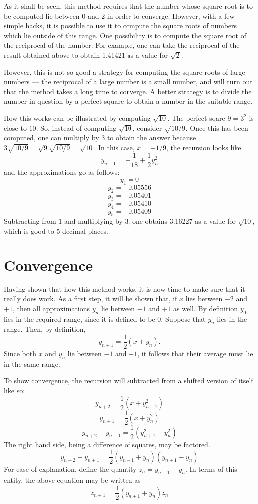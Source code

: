 \documentclass[12pt]{article}
\begin{document}
As it shall be seen, this method requires that the number whose square root is to be computed lie between 0 and 2 in order to converge.  However, with a few simple hacks, it is possible to use it to compute the square roots of numbers which lie outside of this range.  One possibility is to compute the square root of the reciprocal of the number.  For example, one can take the reciprocal of the result obtained above to obtain 1.41421 as a value for $\sqrt{2}$.

However, this is not so good a strategy for computing the square roots of large numbers --- the reciprocal of a large number is a small number, and will turn out that the method takes a long time to converge.  A better strategy is to divide the number in question by a perfect square to obtain a number in the suitable range.  

How this works can be illustrated by computing $\sqrt{10}$.  The perfect sqare $9 = 3^2$ is close to $10$.  So, instead of computing $\sqrt{10}$, consider $\sqrt{10/9}$.  Once this has been computed, one can multiply by $3$ to obtain the answer because $3 \sqrt{10/9} = \sqrt{9} \sqrt{10/9} = \sqrt{10}$.  In this case, $x = -1/9$, the recursion looks like
 \[ y_{n+1} = -\frac{1}{18} + \frac{1}{2} y_n^2 \]
and the approximations go as follows:
 \[ y_1 = 0 \]
 \[ y_2 = -0.05556 \]
 \[ y_3 = -0.05401 \]
 \[ y_4 = -0.05410 \]
 \[ y_5 = -0.05409 \]
Subtracting from 1 and multiplying by 3, one obtains 3.16227 as a value for $\sqrt{10}$, which is good to 5 decimal places.

\section{Convergence}

Having shown that how this method works, it is now time to make sure that it really does work.  As a first step, it will be shown that, if $x$ lies between $-2$ and $+1$, then all approximations $y_n$ lie between $-1$ and $+1$ as well.  By definition $y_0$ lies in the required range, since it is defined to be 0.  Suppose that $y_n$ lies in the range.  Then, by definition,
 \[ y_{n+1} = \frac{1}{2} (x + y_n) .\]
Since both $x$ and $y_n$ lie between $-1$ and $+1$, it follows that their average must lie in the same range.

To show convergence, the recursion will subtracted from a shifted version of itself like so:
 \[ y_{n+2} = \frac{1}{2} (x + y_{n+1}^2) \]
 \[ y_{n+1} = \frac{1}{2} (x + y_n^2) \]
 \[ y_{n+2} - y_{n+1} = \frac{1}{2} (y_{n+1}^2 - y_n^2) \]
The right hand side, being a difference of squares, may be factored.
 \[ y_{n+2} - y_{n+1} = \frac{1}{2} (y_{n+1} + y_n) (y_{n+1} - y_n) \]
For ease of explanation, define the quantity $z_n = y_{n+1} - y_n$.  In terms of this entity, the above equation may be written as
 \[ z_{n+1} = \frac{1}{2} (y_{n+1} + y_n) z_n \]
\end{document}
